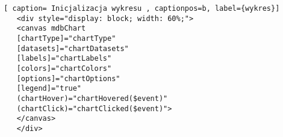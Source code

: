 \begin{lstlisting} [ caption= Inicjalizacja wykresu , captionpos=b, label={wykres}]
	<div style="display: block; width: 60%;">
	<canvas mdbChart
	[chartType]="chartType"
	[datasets]="chartDatasets"
	[labels]="chartLabels"
	[colors]="chartColors"
	[options]="chartOptions"
	[legend]="true"
	(chartHover)="chartHovered($event)"
	(chartClick)="chartClicked($event)">
	</canvas>
	</div>
\end{lstlisting}
